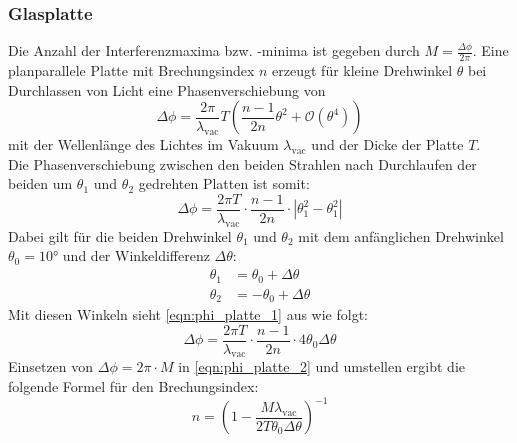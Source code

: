         \subsubsection{Glasplatte}
            Die Anzahl der Interferenzmaxima bzw. -minima ist gegeben durch $M = \frac{\Delta \phi}{2 \pi}$. Eine planparallele Platte mit Brechungsindex $n$ erzeugt für kleine Drehwinkel $\theta$ bei Durchlassen von Licht eine Phasenverschiebung von
            \begin{equation*}
                \Delta \phi = \frac{2\pi}{\lambda_{\text{vac}}} T \left(\frac{n - 1}{2n} \theta^2 + \mathcal{O}\left(\theta^4\right)\right)
            \end{equation*}
            mit der Wellenlänge des Lichtes im Vakuum $\lambda_{\text{vac}}$ und der Dicke der Platte $T$. \cite{tu_dortmund_versuchsanleitung_2021-1}\\
            Die Phasenverschiebung zwischen den beiden Strahlen nach Durchlaufen der beiden um $\theta_1$ und $\theta_2$ gedrehten Platten ist somit:
            \begin{equation}
                \Delta \phi = \frac{2\pi T}{\lambda_{\text{vac}}} \cdot \frac{n - 1}{2n} \cdot |\theta^2_1 - \theta^2_1|
                \label{eqn:phi_platte_1}
            \end{equation}
            Dabei gilt für die beiden Drehwinkel $\theta_1$ und $\theta_2$ mit dem anfänglichen Drehwinkel $\theta_0 = 10°$ und der Winkeldifferenz $\Delta \theta$:
            \begin{align*}
                \theta_1 &= \theta_0 + \Delta \theta \\
                \theta_2 &= -\theta_0 + \Delta \theta
            \end{align*}
            Mit diesen Winkeln sieht \eqref{eqn:phi_platte_1} aus wie folgt:
            \begin{equation}
                \Delta \phi = \frac{2\pi T}{\lambda_{\text{vac}}} \cdot \frac{n - 1}{2n} \cdot 4 \theta_0 \Delta\theta
                \label{eqn:phi_platte_2}
            \end{equation}
            Einsetzen von $\Delta \phi = 2\pi \cdot M$ in \eqref{eqn:phi_platte_2} und umstellen ergibt die folgende Formel für den Brechungsindex:
            \begin{equation}
                n = \left(1 - \frac{M \lambda_{\text{vac}}}{2 T \theta_0 \Delta\theta}\right)^{-1}
                \label{eqn:n_platte}
            \end{equation}

